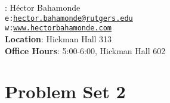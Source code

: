 \documentclass[10pt]{article}
\begin{document}


\thispagestyle{fancy} %





\hspace{-5mm}{\bf Instructor}: H\'ector Bahamonde\\
\texttt{e:}\href{mailto:hector.bahamonde@rutgers.edu}{\texttt{hector.bahamonde@rutgers.edu}}\\
\texttt{w:}\href{http://www.hectorbahamonde.com}{\texttt{www.hectorbahamonde.com}}\\
{\bf Location}: Hickman Hall 313\\
{\bf Office Hours}: 5:00-6:00, Hickman Hall 602

\section*{Problem Set 2}
\end{document}
